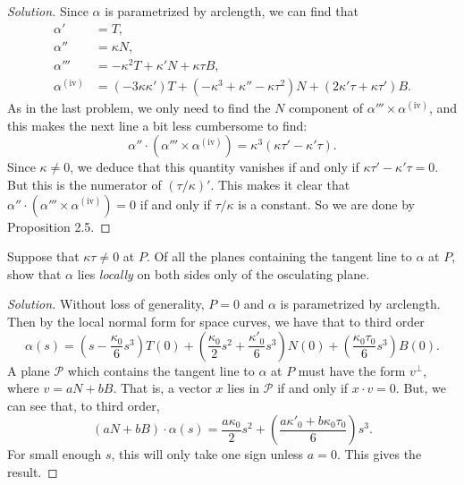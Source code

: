 \documentclass[Shifrin_Solutions_Spring_2018]{subfiles}
\begin{document}
\begin{proof}[Solution]
Since $\alpha$ is parametrized by arclength, we can find that
\begin{align*}
\alpha' & = T ,\\
\alpha'' & = \kappa N ,\\
\alpha''' & = -\kappa^2 T +  \kappa' N + \kappa\tau B , \\
\alpha^{\mathrm{(iv)}} & = (-3\kappa \kappa') T 
 + (-\kappa^3 + \kappa''  - \kappa \tau^2 ) N 
 + (2\kappa'\tau + \kappa \tau') B.
\end{align*}
As in the last problem, we only need to find the $N$ component of 
$\alpha'''\times \alpha^{\mathrm{(iv)}}$, and this makes the next line a bit 
less cumbersome to find:
\[
\alpha''\cdot (\alpha''' \times \alpha^{\mathrm{(iv)}} ) = 
\kappa^3 ( \kappa \tau' - \kappa' \tau ) .
\]
Since $\kappa \neq 0$, we deduce that this quantity vanishes if and only if 
$\kappa \tau' - \kappa' \tau = 0$. But this is the numerator of
$(\tau/\kappa)'$. This makes it clear that 
$\alpha''\cdot(\alpha'''\times\alpha^{(\mathrm{iv})}) = 0$ if and only if 
$\tau/\kappa$ is a constant. So we are done by Proposition 2.5.
\end{proof}

\clearpage


\begin{exercise}
Suppose that $\kappa\tau \neq 0$ at $P$. Of all the planes containing the tangent 
line to $\alpha$ at $P$, show that $\alpha$ lies \emph{locally} on both sides only 
of the osculating plane.
\end{exercise}

\begin{proof}[Solution]
Without loss of generality, $P= 0$ and $\alpha$ is parametrized by arclength. Then 
by the local normal form for space curves, we have that to third order
\[
\alpha(s) = \left(s - \dfrac{\kappa_0}{6} s^3 \right) T(0) 
+ \left( \dfrac{\kappa_0}{2}s^2 + \dfrac{\kappa'_0}{6} s^3\right) N(0) 
+ \left( \dfrac{\kappa_0\tau_0}{6} s^3 \right) B(0) .
\]
A plane $\mathcal{P}$ which contains the tangent line to $\alpha$ at $P$ must have 
the form $v^{\perp}$, where $v = a N + b B$. That is, a vector $x$ lies in 
$\mathcal{P}$ if and only if $
x \cdot v = 0$. But, we can see that, to third order,
\[
(a N + b B ) \cdot \alpha(s) = \dfrac{a\kappa_0}{2} s^2 
+ \left( \dfrac{a\kappa'_0 + b\kappa_0 \tau_0}{6} \right) s^3 .
\]
For small enough $s$, this will only take one sign unless $a=0$. This gives the result.
\end{proof}
\end{document}
